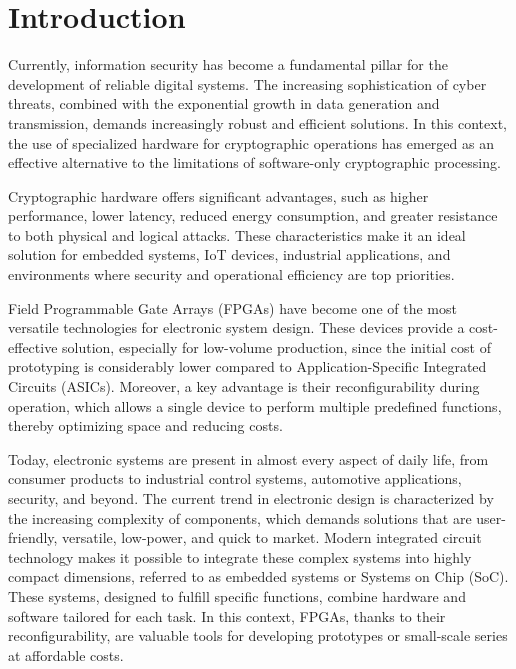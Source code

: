 \documentclass[journal,article,submit,pdftex,moreauthors]{Definitions/mdpi}
\begin{document}
\setcounter{section}{0} %



\section{Introduction}

Currently, information security has become a fundamental pillar for the development of reliable digital systems. The increasing sophistication of cyber threats, combined with the exponential growth in data generation and transmission, demands increasingly robust and efficient solutions. In this context, the use of specialized hardware for cryptographic operations has emerged as an effective alternative to the limitations of software-only cryptographic processing.

Cryptographic hardware offers significant advantages, such as higher performance, lower latency, reduced energy consumption, and greater resistance to both physical and logical attacks. These characteristics make it an ideal solution for embedded systems, IoT devices, industrial applications, and environments where security and operational efficiency are top priorities.

Field Programmable Gate Arrays (FPGAs) have become one of the most versatile technologies for electronic system design. These devices provide a cost-effective solution, especially for low-volume production, since the initial cost of prototyping is considerably lower compared to Application-Specific Integrated Circuits (ASICs). Moreover, a key advantage is their reconfigurability during operation, which allows a single device to perform multiple predefined functions, thereby optimizing space and reducing costs.

Today, electronic systems are present in almost every aspect of daily life, from consumer products to industrial control systems, automotive applications, security, and beyond. The current trend in electronic design is characterized by the increasing complexity of components, which demands solutions that are user-friendly, versatile, low-power, and quick to market. Modern integrated circuit technology makes it possible to integrate these complex systems into highly compact dimensions, referred to as embedded systems or Systems on Chip (SoC). These systems, designed to fulfill specific functions, combine hardware and software tailored for each task. In this context, FPGAs, thanks to their reconfigurability, are valuable tools for developing prototypes or small-scale series at affordable costs.
\end{document}

